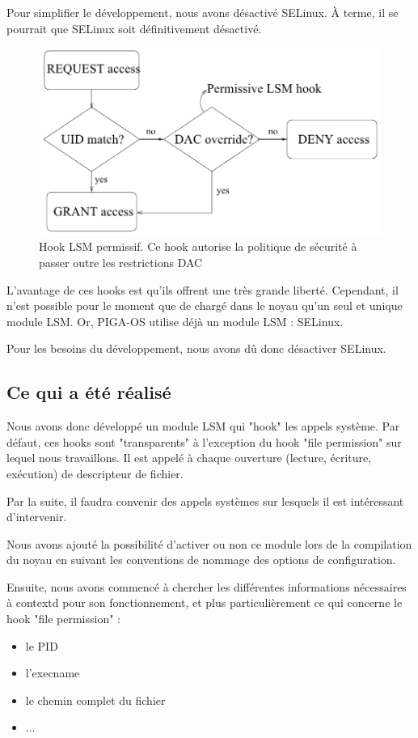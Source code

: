 \documentclass[pdftex,a4paper,titlepage,11pt,openright]{article}
\begin{document}
Pour simplifier le développement, nous avons désactivé SELinux. \`A terme, il se pourrait que SELinux soit définitivement désactivé.

\begin{figure}%
	\centering
	\includegraphics[scale=0.45]{lsm2.png}
	\caption{Hook LSM permissif. Ce hook autorise la politique de sécurité à passer outre les restrictions DAC \cite{LSMINTRO}}
\end{figure}

L'avantage de ces hooks est qu'ils offrent une très grande liberté. Cependant, il n'est possible pour le moment que de chargé dans le noyau qu'un seul et unique module LSM. Or, PIGA-OS utilise déjà un module LSM : SELinux.

Pour les besoins du développement, nous avons dû donc désactiver SELinux.

\newpage

\subsection{Ce qui a été réalisé}

Nous avons donc développé un module LSM qui "hook" les appels système. Par défaut, ces hooks sont "transparents" à l'exception du hook "file permission" sur lequel nous travaillons. Il est appelé à chaque ouverture (lecture, écriture, exécution) de descripteur de fichier.

Par la suite, il faudra convenir des appels systèmes sur lesquels il est intéressant d'intervenir.

Nous avons ajouté la possibilité d'activer ou non ce module lors de la compilation du noyau en suivant les conventions de nommage des options de configuration.

Ensuite, nous avons commencé à chercher les différentes informations nécessaires à contextd pour son fonctionnement, et plus particulièrement ce qui concerne le hook "file permission" :
	\begin{itemize}
		\item le PID
		\item l'execname
		\item le chemin complet du fichier
		\item ...
	\end{itemize}
\end{document}
